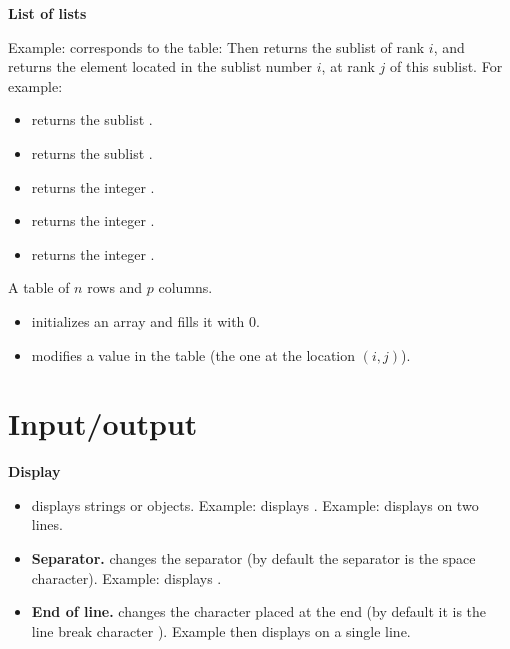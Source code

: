 \documentclass[11pt,class=report,crop=false]{standalone}
\begin{document}
\bigskip	 

\textbf{List of lists}
  
Example: 
  corresponds to the table:
  Then  returns the sublist of rank $i$, and
   returns the element located in the sublist number $i$, at rank $j$  of this sublist. For example:
  \begin{itemize}
  \item {} \quad returns the sublist \ci{[2,14,5]}.
  \item {} \quad returns the sublist \ci{[3,5,7]}.
  \item {} \quad returns the integer .
  \item {} \quad returns the integer .
  \item {} \quad returns the integer .
\end{itemize}

\medskip

A table of $n$ rows and $p$ columns.
\begin{itemize}
    \item {} \quad initializes an array and fills it with $0$.
    \item {} \quad modifies a value in the table (the one at the location $(i,j)$).
\end{itemize}


\section{Input/output}

\textbf{Display}

\begin{itemize}
  \item {} \quad displays strings or objects.
 Example:  displays .
 Example:  displays on two lines.
 
  \item \textbf{Separator.}  \quad changes the separator (by default the separator is the space character). Example:  displays
  .
  
   \item \textbf{End of line.}  \quad changes the character placed at the end (by default it is the line break character \ci{\\n}).
   Example  then  displays  on a single line.
   
\end{itemize}
\end{document}
